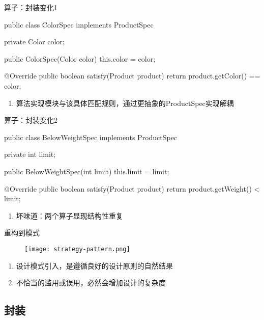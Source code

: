\begin{frame}[fragile]{算子：封装变化1}
  \begin{java}
public class ColorSpec implements ProductSpec {
  private Color color;

  public ColorSpec(Color color) {
    this.color = color;
  }

  @Override
  public boolean satisfy(Product product) {
    return product.getColor() == color;
  }
}
  \end{java}

\begin{enumerate}
  \item 算法实现模块与该具体匹配规则，通过更抽象的ProductSpec实现解耦
\end{enumerate}      
\end{frame}


\begin{frame}[fragile]{算子：封装变化2}
  \begin{java}
public class BelowWeightSpec implements ProductSpec {
  private int limit;

  public BelowWeightSpec(int limit) {
    this.limit = limit;
  }

  @Override
  public boolean satisfy(Product product) {
    return product.getWeight() < limit;
  }
}
  \end{java}

\begin{enumerate}
  \item 坏味道：两个算子显现结构性重复
\end{enumerate}        
\end{frame}

\begin{frame}[fragile]{重构到模式}
  \begin{figure}
    \centering
    \texttt{[image: strategy-pattern.png]}
  \end{figure}
\begin{enumerate}
  \item 设计模式引入，是遵循良好的设计原则的自然结果
  \item 不恰当的滥用或误用，必然会增加设计的复杂度
\end{enumerate}        

\end{frame}

\subsection{封装}

